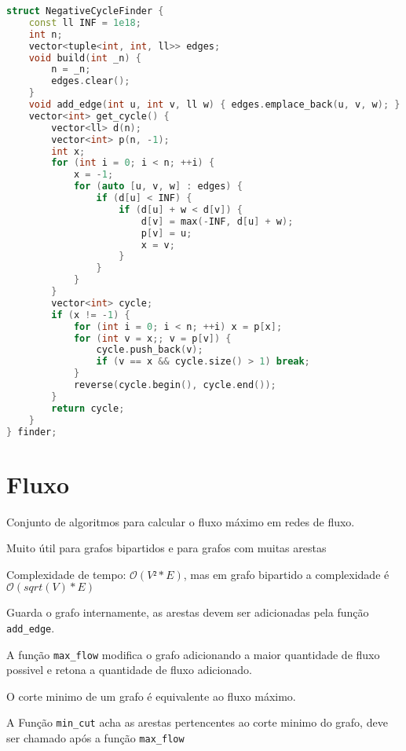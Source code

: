 \documentclass[10pt, a4paper, oneside]{book}
\begin{document}
\begin{lstlisting}[language=C++]
struct NegativeCycleFinder {
    const ll INF = 1e18;
    int n;
    vector<tuple<int, int, ll>> edges;
    void build(int _n) {
        n = _n;
        edges.clear();
    }
    void add_edge(int u, int v, ll w) { edges.emplace_back(u, v, w); }
    vector<int> get_cycle() {
        vector<ll> d(n);
        vector<int> p(n, -1);
        int x;
        for (int i = 0; i < n; ++i) {
            x = -1;
            for (auto [u, v, w] : edges) {
                if (d[u] < INF) {
                    if (d[u] + w < d[v]) {
                        d[v] = max(-INF, d[u] + w);
                        p[v] = u;
                        x = v;
                    }
                }
            }
        }
        vector<int> cycle;
        if (x != -1) {
            for (int i = 0; i < n; ++i) x = p[x];
            for (int v = x;; v = p[v]) {
                cycle.push_back(v);
                if (v == x && cycle.size() > 1) break;
            }
            reverse(cycle.begin(), cycle.end());
        }
        return cycle;
    }
} finder;
\end{lstlisting}
\hfill

\section{Fluxo}


Conjunto de algoritmos para calcular o fluxo máximo em redes de fluxo.



\textbf{} 


Muito útil para grafos bipartidos e para grafos com muitas arestas



Complexidade de tempo: $\mathcal{O}(V² * E)$, mas em grafo bipartido a complexidade é $\mathcal{O}(sqrt(V) * E)$



Guarda o grafo internamente, as arestas devem ser adicionadas pela função \texttt{add\_edge}.



A função \texttt{max\_flow} modifica o grafo adicionando a maior quantidade de fluxo possivel e retona a quantidade de fluxo adicionado.



O corte minimo de um grafo é equivalente ao fluxo máximo.

A Função \texttt{min\_cut} acha as arestas pertencentes ao corte minimo do grafo, deve ser chamado após a função \texttt{max\_flow}
\end{document}
